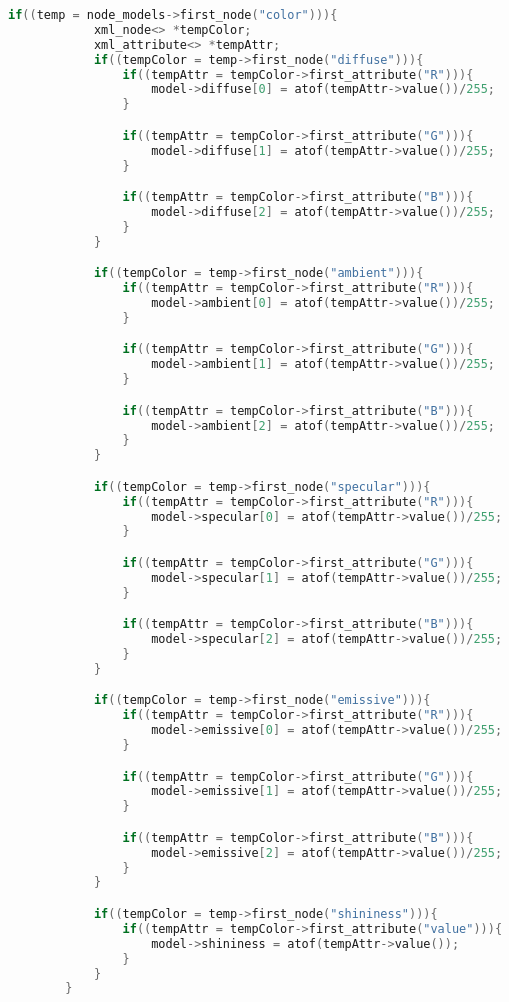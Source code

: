 \documentclass[14pt, a4 paper]{report}
\begin{document}
\begin{lstlisting}[language = c++]
if((temp = node_models->first_node("color"))){
            xml_node<> *tempColor;
            xml_attribute<> *tempAttr;
            if((tempColor = temp->first_node("diffuse"))){
                if((tempAttr = tempColor->first_attribute("R"))){
                    model->diffuse[0] = atof(tempAttr->value())/255;
                }

                if((tempAttr = tempColor->first_attribute("G"))){
                    model->diffuse[1] = atof(tempAttr->value())/255;
                }

                if((tempAttr = tempColor->first_attribute("B"))){
                    model->diffuse[2] = atof(tempAttr->value())/255;
                }
            }

            if((tempColor = temp->first_node("ambient"))){
                if((tempAttr = tempColor->first_attribute("R"))){
                    model->ambient[0] = atof(tempAttr->value())/255;
                }

                if((tempAttr = tempColor->first_attribute("G"))){
                    model->ambient[1] = atof(tempAttr->value())/255;
                }

                if((tempAttr = tempColor->first_attribute("B"))){
                    model->ambient[2] = atof(tempAttr->value())/255;
                }
            }

            if((tempColor = temp->first_node("specular"))){
                if((tempAttr = tempColor->first_attribute("R"))){
                    model->specular[0] = atof(tempAttr->value())/255;
                }

                if((tempAttr = tempColor->first_attribute("G"))){
                    model->specular[1] = atof(tempAttr->value())/255;
                } 

                if((tempAttr = tempColor->first_attribute("B"))){
                    model->specular[2] = atof(tempAttr->value())/255;
                }
            }

            if((tempColor = temp->first_node("emissive"))){
                if((tempAttr = tempColor->first_attribute("R"))){
                    model->emissive[0] = atof(tempAttr->value())/255;
                }

                if((tempAttr = tempColor->first_attribute("G"))){
                    model->emissive[1] = atof(tempAttr->value())/255;
                }

                if((tempAttr = tempColor->first_attribute("B"))){
                    model->emissive[2] = atof(tempAttr->value())/255;
                }
            }

            if((tempColor = temp->first_node("shininess"))){
                if((tempAttr = tempColor->first_attribute("value"))){
                    model->shininess = atof(tempAttr->value());
                }
            }
        }
\end{lstlisting}
\end{document}
